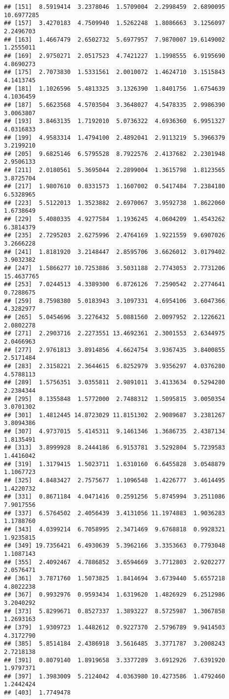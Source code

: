 \documentclass[
]{article}
\begin{document}
\begin{verbatim}
## [151]  8.5919414  3.2378046  1.5709004  2.2998459  2.6890095 10.6977285
## [157]  3.4270183  4.7509940  1.5262248  1.8086663  3.1256097  2.2496703
## [163]  1.4667479  2.6502732  5.6977957  7.9870007 19.6149002  1.2555011
## [169]  2.9750271  2.0517523  4.7421227  1.1998555  6.9195690  4.8690273
## [175]  2.7073830  1.5331561  2.0010072  1.4624710  3.1515843  4.1413745
## [181]  1.1026596  5.4813325  3.1326390  1.8401756  1.6754639  4.1036459
## [187]  5.6623568  4.5703504  3.3648027  4.5478335  2.9986390  3.0063807
## [193]  3.8463135  1.7192010  5.0736322  4.6936360  6.9951327  4.0316833
## [199]  4.9583314  1.4794100  2.4892041  2.9113219  5.3966379  3.2199210
## [205]  9.6825146  6.5795528  8.7922576  2.4137682  2.2301948  2.9506133
## [211]  2.0180561  5.3695044  2.2899004  1.3615798  1.8123565  3.8725704
## [217]  1.9807610  0.8331573  1.1607002  0.5417484  7.2384180  6.5328965
## [223]  5.5122013  1.3523882  2.6970067  3.9592738  1.8622060  1.6738649
## [229]  5.4080335  4.9277584  1.1936245  4.0604209  1.4543262  6.3814379
## [235]  2.7295203  2.6275996  2.4764169  1.9221559  9.6907026  3.2666228
## [241]  1.8181920  3.2148447  2.8595706  3.6626012  3.0179402  3.9032382
## [247]  1.5866277 10.7253886  3.5031188  2.7743053  2.7731206 15.4637765
## [253]  7.0244513  4.3389300  6.8726126  7.2590542  2.2774641  0.7288675
## [259]  8.7598380  5.0183943  3.1097331  4.6954106  3.6047366  4.3282977
## [265]  5.0454696  3.2276432  5.0881560  2.0097952  2.1226621  2.0802278
## [271]  2.2903716  2.2273551 13.4692361  2.3001553  2.6344975  2.0466963
## [277]  2.9761813  3.8914856  4.6624754  3.9367435  3.8400855  2.5171484
## [283]  2.3158221  2.3644615  6.8252979  3.9356297  4.0376280  4.5788113
## [289]  1.5756351  3.0355811  2.9891011  3.4133634  0.5294280  2.2384344
## [295]  8.1355848  1.5772000  2.7488312  1.5095815  3.0050354  3.0701302
## [301]  1.4812445 14.8723029 11.8151302  2.9089687  3.2381267  3.8094386
## [307]  4.9737015  5.4145311  9.1461346  1.3686735  2.4387134  1.8135491
## [313]  3.8999928  8.2444186  6.9153781  3.5292804  5.7239583  1.4416042
## [319]  1.3179415  1.5023711  1.6310160  6.6455828  3.0548879  1.1067723
## [325]  4.8483427  2.7575677  1.1096548  1.4226777  3.4614495  1.4220732
## [331]  0.8671184  4.0471416  0.2591256  5.8745994  3.2511086  7.9017556
## [337]  6.5764502  2.4056439  3.4131056 11.1974883  1.9036283  1.1788760
## [343]  4.0399214  6.7058995  2.3471469  9.6768818  0.9928321  1.9235815
## [349] 19.7356421  6.4930639  5.3962166  3.3353663  0.7793048  1.1087143
## [355]  2.4092467  4.7886852  3.6594669  3.7712803  2.9202277  2.0576471
## [361]  3.7871760  1.5073825  1.8414694  3.6739440  5.6557218  4.8022238
## [367]  0.9932976  0.9593434  1.6319620  1.4826929  6.2512986  3.2040292
## [373]  5.8299671  0.8527337  1.3893227  8.5725987  1.3067858  1.2693163
## [379]  1.9309723  1.4482612  0.9227370  2.5796789  9.9414503  4.3172790
## [385]  5.8514184  2.4386918  3.5616485  3.3771787  3.2008243  2.7218138
## [391]  0.8079140  1.8919658  3.3377289  3.6912926  7.6391920  1.9797371
## [397]  1.3983009  5.2124042  4.0363980 10.4273586  1.4792460  1.2442424
## [403]  1.7749478
\end{verbatim}
\end{document}
